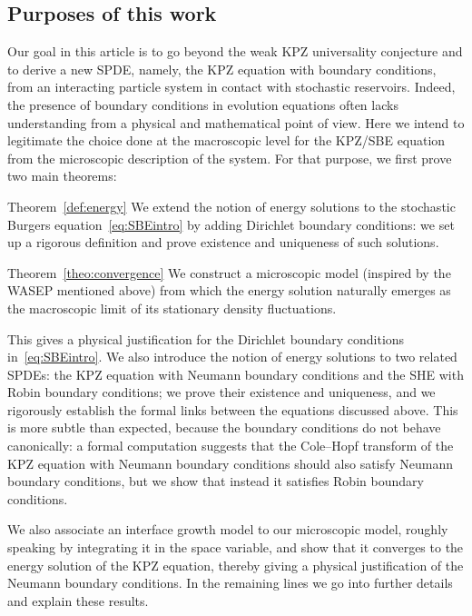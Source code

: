 \documentclass[AHL,Unicode,longabstracts]{cedram}
\begin{document}
\subsection{Purposes of this work}

Our goal in this article is to go beyond the weak KPZ universality conjecture and to derive a new SPDE, namely, the KPZ equation with boundary conditions, from an interacting particle system in contact with stochastic reservoirs. Indeed, the presence of boundary conditions in evolution equations often lacks understanding from a physical and mathematical point of view. Here we intend to legitimate the choice done at the macroscopic level for the KPZ/SBE equation from the microscopic description of the system. For that purpose, we first prove two main theorems:

\begin{enonce*}{Theorem~\ref{def:energy}}
We extend the notion of energy solutions to the stochastic Burgers equation~\eqref{eq:SBEintro} by adding Dirichlet boundary conditions: we set up a rigorous definition and prove existence and uniqueness of such solutions.
\end{enonce*}

\begin{enonce*}{Theorem~\ref{theo:convergence}}
We construct a microscopic model (inspired by the WASEP mentioned above) from which the energy solution naturally emerges as the macroscopic limit of its stationary density fluctuations.
\end{enonce*}

This gives a physical justification for the Dirichlet boundary conditions in~\eqref{eq:SBEintro}. We also introduce the notion of energy solutions to two related SPDEs: the KPZ equation with Neumann boundary conditions and the SHE with Robin boundary conditions; we prove their existence and uniqueness, and we rigorously establish the formal links between the equations discussed above. This is more subtle than expected, because the boundary conditions do not behave canonically: a formal computation suggests that the Cole--Hopf transform of the KPZ equation with Neumann boundary conditions should also satisfy Neumann boundary conditions, but we show that instead it satisfies Robin boundary conditions.

We also associate an interface growth model to our microscopic model, roughly speaking by integrating it in the space variable, and show that it converges to the energy solution of the KPZ equation, thereby giving a physical justification of the Neumann boundary conditions. In the remaining lines we go into further details and explain these results.
\end{document}
